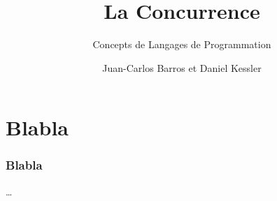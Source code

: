 \documentclass{beamer}
\title{La Concurrence}
\subtitle{Concepts de Langages de Programmation}
\author{Juan-Carlos Barros et Daniel Kessler}
\begin{document}
\begin{frame}
  \titlepage
\end{frame}

\begin{frame}
  \tableofcontents
\end{frame}

\section{Blabla}
\begin{frame}
  \frametitle{Blabla}
  \ldots
\end{frame}
\end{document}
